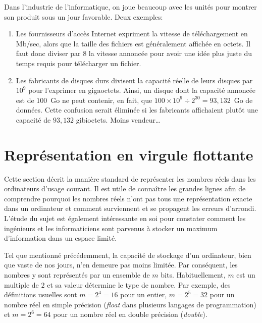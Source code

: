 \documentclass[letterpaper,11pt,english,french]{memoir}
\theoremstyle{plain}
\theoremstyle{definition}
\theoremstyle{remark}
\begin{document}
Dans l'industrie de l'informatique, on joue beaucoup avec les unités
pour montrer son produit sous un jour favorable. Deux exemples:
\begin{enumerate}
\item Les fournisseurs d'accès Internet expriment la vitesse de
  téléchargement en Mb/sec, alors que la taille des fichiers est
  généralement affichée en octets. Il faut donc diviser par 8 la
  vitesse annoncée pour avoir une idée plus juste du temps requis pour
  télécharger un fichier.
\item Les fabricants de disques durs divisent la capacité réelle de
  leurs disques par $10^9$ pour l'exprimer en gigaoctets. Ainsi, un
  disque dont la capacité annoncée est de $100$~Go ne peut contenir, en
  fait, que $100 \times 10^9 \div 2^{30} = 93,132$~Go de données.
  Cette confusion serait éliminée si les fabricants affichaient plutôt
  une capacité de $93,132$ gibioctets. Moins vendeur\dots
\end{enumerate}



\section{Représentation en virgule flottante}
\label{sec:ordinateurs:ieee}

Cette section décrit la manière standard de représenter les nombres
réels dans les ordinateurs d'usage courant. Il est utile de
connaître les grandes lignes afin de comprendre pourquoi les nombres
réels n'ont pas tous une représentation exacte dans un ordinateur et
comment surviennent et se propagent les erreurs d'arrondi. L'étude du
sujet est également intéressante en soi pour constater comment les
ingénieurs et les informaticiens sont parvenus à stocker un maximum
d'information dans un espace limité.

Tel que mentionné précédemment, la capacité de stockage d'un
ordinateur, bien que vaste de nos jours, n'en demeure pas moins
limitée. Par conséquent, les nombres y sont représentés par un
ensemble de $m$ bits. Habituellement, $m$ est un multiple de $2$ et sa
valeur détermine le type de nombre. Par exemple, des définitions
usuelles sont $m = 2^4 = 16$ pour un entier, $m = 2^5 = 32$ pour un
nombre réel en simple précision (\emph{float} dans plusieurs langages
de programmation) et $m = 2^6 = 64$ pour un nombre réel en double
précision (\emph{double}).
\end{document}

